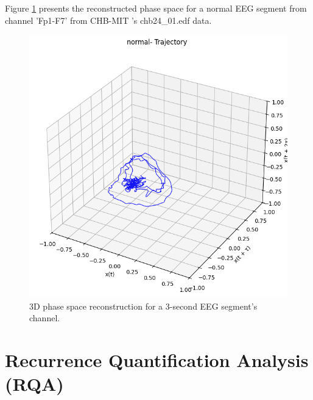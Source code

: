 \documentclass{article}
\begin{document}
			Figure \ref{fig:phase_space_3d} presents the reconstructed phase space for a normal EEG segment from channel 'Fp1-F7' from CHB-MIT 's chb24\_01.edf data.

				\begin{figure}[h!]
				    \centering
				    \includegraphics[width=0.7\linewidth]{phase_space_3d.png} %
				    \caption{3D phase space reconstruction for a 3-second EEG segment's channel.}
				    \label{fig:phase_space_3d}
				\end{figure}







					
	\newpage
				\section{Recurrence Quantification Analysis (RQA)}
\end{document}
